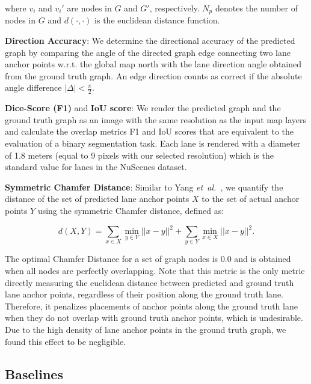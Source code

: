 \documentclass[letterpaper, 10 pt, conference]{ieeeconf}
\newcommand{\etal}{\emph{et~al.~}}
\begin{document}
where $v_i$ and $v_i'$ are nodes in $G$ and $G'$, respectively. $N_p$ denotes the number of nodes in $G$ and $d(\cdot,\cdot)$ is the euclidean distance function.

\textbf{\textbf{Direction Accuracy}}: We determine the directional accuracy of the predicted graph by comparing the angle of the directed graph edge connecting two lane anchor points w.r.t. the global map north with the lane direction angle obtained from the ground truth graph. An edge direction counts as correct if the absolute angle difference $|\Delta| < \frac{\pi}{2}$.


\textbf{Dice-Score (F1)} and \textbf{IoU score}: We render the predicted graph and the ground truth graph as an image with the same resolution as the input map layers and calculate the overlap metrics F1 and IoU scores that are equivalent to the evaluation of a binary segmentation task. Each lane is rendered with a diameter of 1.8 meters (equal to 9 pixels with our selected resolution) which is the standard value for lanes in the NuScenes dataset.
    
    
\textbf{Symmetric Chamfer Distance}: Similar to Yang \etal \cite{yang2018graph}, we quantify the distance of the set of predicted lane anchor points $X$ to the set of actual anchor points $Y$ using the symmetric Chamfer distance, defined as:

\begin{equation}
    d(X, Y) = \sum_{x \in X} \min_{y \in Y} ||x-y||^2 + \sum_{y \in Y} \min_{x \in X} ||x-y||^2.
\end{equation}

The optimal Chamfer Distance for a set of graph nodes is $0.0$ and is obtained when all nodes are perfectly overlapping. Note that this metric is the only metric directly measuring the euclidean distance between predicted and ground truth lane anchor points, regardless of their position along the ground truth lane. Therefore, it penalizes placements of anchor points along the ground truth lane when they do not overlap with ground truth anchor points, which is undesirable. Due to the high density of lane anchor points in the ground truth graph, we found this effect to be negligible.


\subsection{Baselines}
\end{document}
